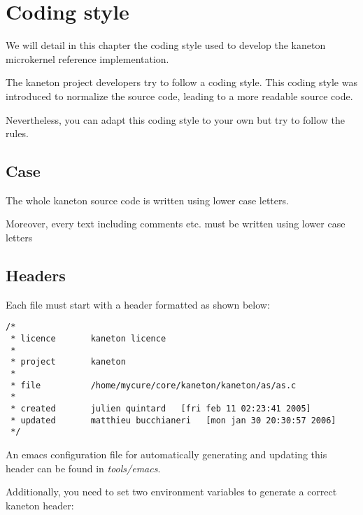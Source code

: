 
%
%

\chapter{Coding style}

We will detail in this chapter the coding style used to develop the
kaneton microkernel reference implementation.

\newpage

%
%

The kaneton project developers try to follow a coding style. This
coding style was introduced to normalize the source code, leading to a
more readable source code.

Nevertheless, you can adapt this coding style to your own but try to
follow the rules.

\section{Case}

The whole kaneton source code is written using lower case letters.

Moreover, every text including comments etc. must be written using
lower case letters

%
%

\section{Headers}

Each file must start with a header formatted as shown below:

\begin{verbatim}
/*
 * licence       kaneton licence
 *
 * project       kaneton
 *
 * file          /home/mycure/core/kaneton/kaneton/as/as.c
 *
 * created       julien quintard   [fri feb 11 02:23:41 2005]
 * updated       matthieu bucchianeri   [mon jan 30 20:30:57 2006]
 */
\end{verbatim}

An emacs configuration file for automatically generating and updating
this header can be found in \textit{tools/emacs}.

Additionally, you need to set two environment variables to generate
a correct kaneton header:

